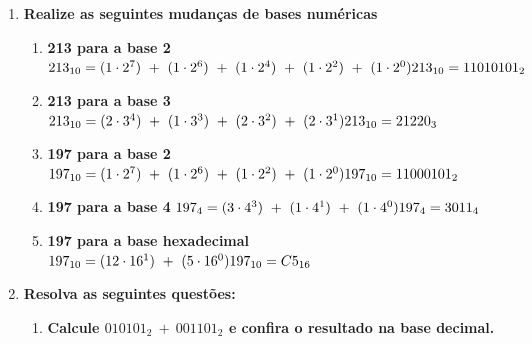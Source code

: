 \documentclass{abntex2}
\begin{document}
  \begin{enumerate}
    \item \textbf{Realize as seguintes mudanças de bases numéricas}
    \begin{enumerate}
      \item \textbf{ 213 para a base 2}
        \begin{math}
          \\ 213_{10} = (1 \cdot 2^{7}) \ + \ (1 \cdot 2^{6}) \ + \ (1 \cdot 2^{4}) \ + \ (1 \cdot 2^{2}) \ + \ (1 \cdot 2^{0})
          \\ 213_{10} = 11010101_{2}
        \end{math}
      \item \textbf{213 para a base 3}
        \begin{math}
          \\ 213_{10} = (2 \cdot 3^{4}) \ + \ (1 \cdot 3^{3}) \ + \ (2 \cdot 3^{2}) \ + \ (2 \cdot 3^{1})
          \\ 213_{10} = 21220_{3}
        \end{math}
      \item \textbf{197 para a base 2}
        \begin{math}
          \\ 197_{10} = (1 \cdot 2^{7}) \ + \ (1 \cdot 2^{6}) \ + \ (1 \cdot 2 ^{2}) \ + \ (1 \cdot 2^{0})
          \\ 197_{10} = 11000101_{2}
        \end{math}
      \item \textbf{197 para a base 4}
        \begin{math}
          \\ 197_{4} = (3 \cdot 4^{3}) \ + \ (1 \cdot 4^{1}) \ + \ (1 \cdot 4^{0})
          \\ 197_{4} = 3011_{4}
        \end{math}
      \item \textbf{197 para a base hexadecimal}
        \begin{math}
          \\ 197_{10} = (12 \cdot 16^{1}) \ + \ (5 \cdot 16^{0})
          \\ 197_{10} = C5_{16}
        \end{math}
    \end{enumerate}
    \item \textbf{Resolva as seguintes questões:}
    \begin{enumerate}
      \item \textbf{Calcule $ 010101_{2} \ + \ 001101_{2} $ e confira o resultado na base decimal.}

\end{enumerate}
\end{enumerate}
\end{document}
